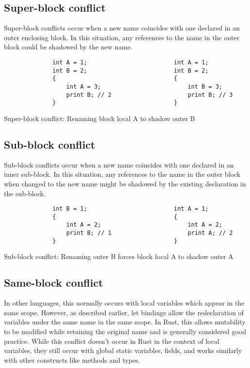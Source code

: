 \subsection{Super-block conflict}
Super-block conflicts occur when a new name coincides with one declared in an outer enclosing block. In this situation, any references to the name in the outer block could be shadowed by the new name.

\begin{fig}[H]
\begin{verbatim}
              int A = 1;                         int A = 1;
              int B = 2;                         int B = 2;
              {                                  {
                  int A = 3;                         int B = 3;
                  print B; // 2                      print B; // 3
              }                                  }
\end{verbatim}
\caption{Super-block conflict: Renaming block local A to shadow outer B}
\label{Fig:super}
\end{fig}

\subsection{Sub-block conflict}
Sub-block conflicts occur when a new name coincides with one declared in an inner sub-block. In this situation, any references to the name in the outer block when changed to the new name might be shadowed by the existing declaration in the sub-block.

\begin{fig}[H]
\begin{verbatim}
              int B = 1;                         int A = 1;
              {                                  {
                  int A = 2;                         int A = 2;
                  print B; // 1                      print A; // 2
              }                                  }
\end{verbatim}
\caption{Sub-block conflict: Renaming outer B forces block local A to shadow outer A}
\label{Fig:sub}
\end{fig}

\subsection{Same-block conflict}
In other languages, this normally occurs with local variables which appear in the same scope. However, as described earlier, let bindings allow the redeclaration of variables under the same name in the same scope. In Rust, this allows mutability to be modified while retaining the original name and is generally considered good practice. While this conflict doesn't occur in Rust in the context of local variables, they still occur with global static variables, fields, and works similarly with other constructs like methods and types.


